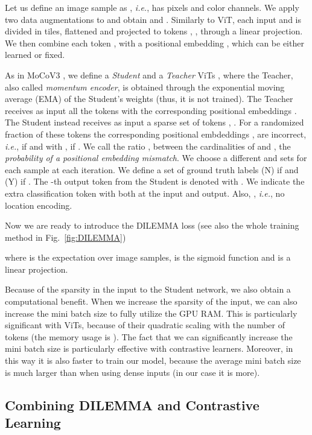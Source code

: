 \documentclass[letterpaper]{article} \usepackage{aaai23}  \usepackage{times}  \usepackage{helvet}  \usepackage{courier}  \usepackage[hyphens]{url}  \usepackage{graphicx} \urlstyle{rm} \def\UrlFont{\rm}  \usepackage{natbib}  \usepackage{caption} \frenchspacing  \setlength{\pdfpagewidth}{8.5in}  \setlength{\pdfpageheight}{11in}  \usepackage{algorithm}
\newcommand{\methodname}{DILEMMA}
\begin{document}
Let us define an image sample as , \emph{i.e.},  has  pixels and  color channels. We apply two data augmentations \cite{Grill2020BootstrapYO} to  and obtain  and . Similarly to ViT, each input  and  is divided in  tiles, flattened and projected to  tokens , , through a linear projection. We then combine each token , with a positional embedding , which can be either learned or fixed.

As in MoCoV3 \cite{chen2021empirical}, we define a \emph{Student}  and a \emph{Teacher}  ViTs \cite{dosovitskiy2020image}, where the Teacher, also called \emph{momentum encoder}, is obtained through the exponential moving average (EMA) of the Student's weights (thus, it is not trained). 
The Teacher receives as input all the tokens  with the corresponding positional embeddings .
The Student instead receives as input a sparse set  of tokens , . For a randomized fraction of these tokens  the corresponding positional embdeddings ,  are incorrect, \emph{i.e.},  if  and  with , if . We call the ratio , between the cardinalities of  and , the \emph{probability of a positional embedding mismatch}.
We choose a different  and  sets for each sample at each iteration.
We define a set of ground truth labels  (N) if  and  (Y) if . The -th output token from the Student is denoted with . We indicate the extra classification token with  both at the input and output. Also, , \emph{i.e.}, no location encoding.

Now we are ready to introduce the {\methodname} loss (see also the whole training method in Fig.~\ref{fig:DILEMMA})

where  is the expectation over image samples,  is the sigmoid function and  is a linear projection.

Because of the sparsity in the input to the Student network, we also obtain a computational benefit. When we increase the sparsity of the input, we can also increase the mini batch size to fully utilize the GPU RAM. This is particularly significant with ViTs, because of their quadratic scaling with the number of tokens (the memory usage is ). The fact that we can significantly increase the mini batch size is particularly effective with contrastive learners. Moreover, in this way it is also faster to train our model, because the average mini batch size is much larger than when using dense inputs (in our case it is  more).

\subsection{Combining {\methodname} and Contrastive Learning}
\label{sec:losses}
\end{document}
